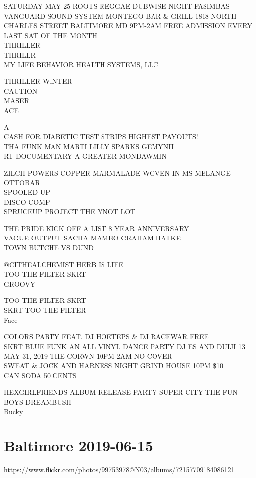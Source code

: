 \documentclass[10pt,letterpaper]{article}
\begin{document}
SATURDAY MAY 25 ROOTS REGGAE DUBWISE NIGHT FASIMBAS VANGUARD SOUND SYSTEM MONTEGO BAR \& GRILL 1818 NORTH CHARLES STREET BALTIMORE MD 9PM{-}2AM FREE ADMISSION EVERY LAST SAT OF THE MONTH\\
THRILLER\\
THRILLR\\
MY LIFE BEHAVIOR HEALTH SYSTEMS, LLC

THRILLER WINTER\\
CAUTION\\
MASER\\
ACE

A\\
CASH FOR DIABETIC TEST STRIPS HIGHEST PAYOUTS!\\
THA FUNK MAN MARTI LILLY SPARKS GEMYNII\\
RT DOCUMENTARY A GREATER MONDAWMIN

ZILCH POWERS COPPER MARMALADE WOVEN IN MS MELANGE OTTOBAR\\
SPOOLED UP\\
DISCO COMP\\
SPRUCEUP PROJECT THE YNOT LOT

THE PRIDE KICK OFF A LIST 8 YEAR ANNIVERSARY\\
VAGUE OUTPUT SACHA MAMBO GRAHAM HATKE\\
TOWN BUTCHE VS DUND

@CITHEALCHEMIST HERB IS LIFE\\
TOO THE FILTER SKRT\\
GROOVY

TOO THE FILTER SKRT\\
SKRT TOO THE FILTER\\
Face

COLORS PARTY FEAT. DJ HOETEPS \& DJ RACEWAR FREE\\
SKRT BLUE FUNK AN ALL VINYL DANCE PARTY DJ ES AND DUIJI 13 MAY 31, 2019 THE CORWN 10PM{-}2AM NO COVER\\
SWEAT \& JOCK AND HARNESS NIGHT GRIND HOUSE 10PM \$10\\
CAN SODA 50 CENTS

HEXGIRLFRIENDS ALBUM RELEASE PARTY SUPER CITY THE FUN BOYS DREAMBUSH\\
Bucky
\pagebreak

\section*{Baltimore 2019-06-15}

\url{https://www.flickr.com/photos/99753978@N03/albums/72157709184086121}
\end{document}
